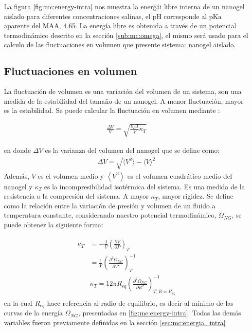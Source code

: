 	
	La figura \ref{fig:mc:energy-intra} nos muestra la energ\'ai libre interna de un nanogel aislado  para diferentes concentraciones salinas, el pH corresponde al pKa aparente del MAA, 4.65. 
	La energ\'ia libre es obtenida a trav\'es de un potencial termodin\'amico descrito en la secci\'on \ref{sub:mc:omega}, el mismo ser\'a usado para el calculo de las fluctuaciones en volumen que presente sistema: nanogel aislado.
	\subsection{Fluctuaciones en volumen}\label{sec:mc:fluctuacion}
	
La fluctuaci\'on de volumen es una variaci\'on del volumen de un sistema, son una medida de la estabilidad del tama\~no de un nanogel. A menor  fluctuaci\'on, mayor es la estabilidad.
	Se puede calcular la fluctuaci\'on en volumen mediante \cite{callen1991thermodynamics}:
	
	\begin{align}
		\frac{\Delta V}{V} = \sqrt{\frac{k_BT}{V}\kappa_T}
	\end{align}
	
	\noindent en donde $\Delta V$ es la varianza del volumen del nanogel que se define como:
	\begin{align}
		\Delta V = \sqrt{\langle V^2\rangle - \langle V \rangle^2}
	\end{align}
	Adem\'as, $V$ es el volumen medio y $\left< V^2\right>$  es el volumen cuadr\'atico medio del nanogel y $\kappa_T$ es la incompresibilidad isot\'ermica del sistema. Es una medida de la resistencia a la compresi\'on del sistema. A mayor $\kappa_T$, mayor rigidez.
	Se define como la relaci\'on entre la variaci\'on de presi\'on y  volumen de un fluido a temperatura constante, considerando nuestro potencial termodin\'amico, $\Omega_{NG}$, se puede obtener la siguiente forma:
	
	
	\begin{align}
		\begin{aligned}
			\kappa_T & = -\frac{1}{V} \left( \frac{\partial V}{\partial P}\right)_T \\
			& =\frac{1}{V} \left( \frac{\partial^2 \Omega_{NG}}{\partial V^2}\right)^{-1}_T \\
			& \kappa_T  = 12 \pi R_{eq} \left( \frac{\partial^2 \Omega_{NG}}{\partial R^2}\right)^{-1}_{T,R=R_{eq}}
		\end{aligned}
	\end{align}
	\noindent en la cual $R_{eq}$ hace referencia al radio de equilibrio, es decir al m\'inimo de las curvas de la energ\'ia $ \Omega_{NG}$, presentadas en \ref{fig:mc:energy-intra}. Todas las dem\'as variables fueron previamente definidas en la secci\'on \ref{sec:mc:energia_intra}
	
